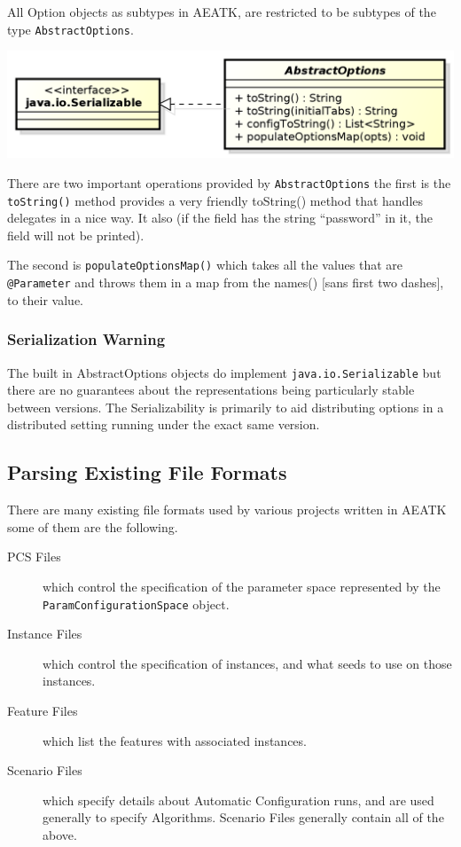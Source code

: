 \documentclass[11pt,letterpaper,oneside]{article}
\begin{document}
All Option objects as subtypes in AEATK, are restricted to be subtypes of the type \texttt{AbstractOptions}.
\begin{center}
\includegraphics[scale=0.75]{img/UML/AbstractOptions.png}
\end{center}

There are two important operations provided by \texttt{AbstractOptions} the first is the \texttt{toString()} method provides a very friendly toString() method that handles delegates in a nice way. It also (if the field has the string ``password'' in it, the field will not be printed).

The second is \texttt{populateOptionsMap()} which takes all the values that are \texttt{@Parameter} and throws them in a map from the names() [sans first two dashes], to their value.

\subsubsection*{Serialization Warning}

The built in AbstractOptions objects do implement \texttt{java.io.Serializable} but there are no guarantees about the representations being particularly stable between versions. The Serializability is primarily to aid distributing options in a distributed setting running under the exact same version. 

\subsection{Parsing Existing File Formats}

There are many existing file formats used by various projects written in AEATK some of them are the following.

\begin{description}
\item[PCS Files] which control the specification of the parameter space represented by the \texttt{ParamConfigurationSpace} object.
\item[Instance Files] which control the specification of instances, and what seeds to use on those instances.
\item[Feature Files] which list the features with associated instances.
\item[Scenario Files] which specify details about Automatic Configuration runs, and are used generally to specify Algorithms. Scenario Files generally contain all of the above.
\end{description}
\end{document}
